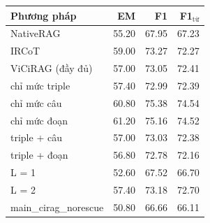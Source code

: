 \begin{tabular}{lrrr}
\toprule
\textbf{Phương pháp} & \textbf{EM} & \textbf{F1} & \textbf{F1$_{\text{từ}}$} \\
\midrule
NativeRAG & 55.20 & 67.95 & 67.23 \\
IRCoT & 59.00 & 73.27 & 72.27 \\
ViCiRAG (đầy đủ) & 57.00 & 73.05 & 72.41 \\
chỉ mức triple & 57.40 & 72.99 & 72.39 \\
chỉ mức câu & 60.80 & 75.38 & 74.54 \\
chỉ mức đoạn & 61.20 & 75.16 & 74.52 \\
triple + câu & 57.00 & 73.03 & 72.38 \\
triple + đoạn & 56.80 & 72.78 & 72.16 \\
L = 1 & 52.60 & 67.52 & 66.70 \\
L = 2 & 57.40 & 73.18 & 72.70 \\
main\_cirag\_norescue & 50.80 & 66.66 & 66.11 \\
\bottomrule
\end{tabular}
